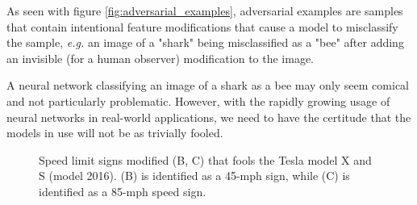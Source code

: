 As seen with figure \ref{fig:adversarial_examples}, adversarial examples are
samples that contain intentional feature modifications that cause a model to
misclassify the sample, \emph{e.g.} an image of a "shark" being misclassified as
a "bee" after adding an invisible (for a human observer) modification to the
image.

A neural network classifying an image of a shark as a bee may only seem comical
and not particularly problematic. However, with the rapidly growing usage of
neural networks in real-world applications, we need to have the certitude that
the models in use will not be as trivially fooled.

\begin{figure}[b]
    \centering
       \caption{Speed limit signs modified (B, C) that fools the Tesla model X
        and S (model 2016). (B) is identified as a 45-mph sign, while (C) is
        identified as a 85-mph speed sign.}
    \label{fig:mcafee_tesla}
\end{figure}

